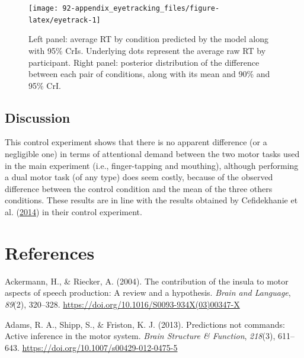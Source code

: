 \documentclass[a4paper,12pt,twoside,openright,oldfontcommands,final]{memoir}
\begin{document}
\begin{figure}[H]
\texttt{[image: 92-appendix\_eyetracking\_files/figure-latex/eyetrack-1]} \caption{Left panel: average RT by condition predicted by the model along with 95\% CrIs. Underlying dots represent the average raw RT by participant. Right panel: posterior distribution of the difference between each pair of conditions, along with its mean and 90\% and 95\% CrI.}\label{fig:eyetrack}
\end{figure}

\hypertarget{discussion-5}{%
\section{Discussion}\label{discussion-5}}

This control experiment shows that there is no apparent difference (or a negligible one) in terms of attentional demand between the two motor tasks used in the main experiment (i.e., finger-tapping and mouthing), although performing a dual motor task (of any type) does seem costly, because of the observed difference between the control condition and the mean of the three others conditions. These results are in line with the results obtained by Cefidekhanie et al. (\protect\hyperlink{ref-cefidekhanie_interaction_2014}{2014}) in their control experiment.

\hypertarget{references}{%
\chapter*{References}\label{references}}


\noindent
\setlength{\parindent}{-0.20in}
\setlength{\leftskip}{0.20in}
\setlength{\parskip}{8pt}

\hypertarget{refs}{}
\leavevmode\hypertarget{ref-ackermann_contribution_2004}{}%
Ackermann, H., \& Riecker, A. (2004). The contribution of the insula to motor aspects of speech production: A review and a hypothesis. \emph{Brain and Language}, \emph{89}(2), 320--328. \url{https://doi.org/10.1016/S0093-934X(03)00347-X}

\leavevmode\hypertarget{ref-adams_predictions_2013}{}%
Adams, R. A., Shipp, S., \& Friston, K. J. (2013). Predictions not commands: Active inference in the motor system. \emph{Brain Structure \& Function}, \emph{218}(3), 611--643. \url{https://doi.org/10.1007/s00429-012-0475-5}
\end{document}

